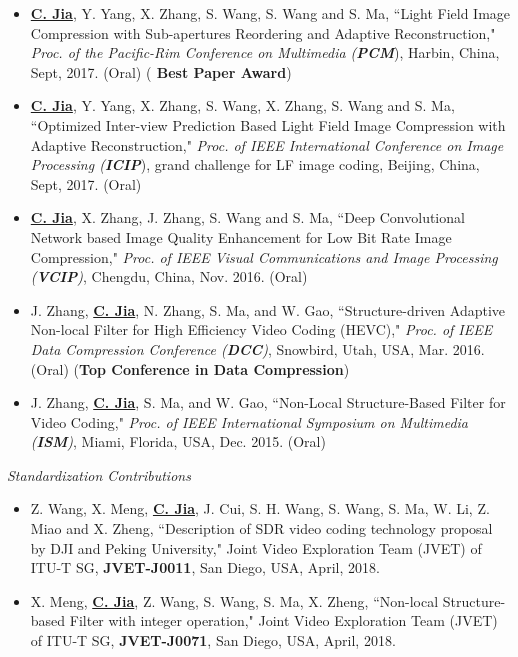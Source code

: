 \documentclass[margin, 10pt]{res} %
\begin{document}
\begin{resume}
\begin{itemize}
\item{\underline{\bf C. Jia}, Y. Yang, X. Zhang, S. Wang, S. Wang and S. Ma, ``Light Field Image Compression with Sub-apertures Reordering and Adaptive Reconstruction," {\em Proc. of the Pacific-Rim Conference on Multimedia ({\bf PCM}}), Harbin, China, Sept, 2017. (Oral)} ({\bf{\color{red} Best Paper Award}})

\item{\underline{\bf C. Jia}, Y. Yang, X. Zhang, S. Wang, X. Zhang, S. Wang and S. Ma, ``Optimized Inter-view Prediction Based Light Field Image Compression with Adaptive Reconstruction," {\em Proc. of IEEE International Conference on Image Processing ({\bf ICIP}}), grand challenge for LF image coding, Beijing, China, Sept, 2017. (Oral)}

\item{\underline{\bf C. Jia}, X. Zhang, J. Zhang, S. Wang and S. Ma, ``Deep Convolutional Network based Image Quality Enhancement for Low Bit Rate Image Compression," {\em Proc. of IEEE Visual Communications and Image Processing ({\bf VCIP})}, Chengdu, China, Nov. 2016. (Oral)}

\item{J. Zhang, \underline{\bf C. Jia},  N. Zhang, S. Ma, and W. Gao, ``Structure-driven Adaptive Non-local Filter for High Efficiency Video Coding (HEVC)," {\em Proc. of IEEE Data Compression Conference ({\bf DCC})}, Snowbird, Utah, USA, Mar. 2016. (Oral) ({\bf Top Conference in Data Compression})}

\item{J. Zhang, \underline{\bf C. Jia}, S. Ma, and W. Gao, ``Non-Local Structure-Based Filter for Video Coding," {\em Proc. of IEEE International Symposium on Multimedia ({\bf ISM})}, Miami, Florida, USA, Dec. 2015. (Oral)}

\end{itemize}

{\sl Standardization Contributions}
\begin{itemize}
\item{Z. Wang, X. Meng, \underline{\bf C. Jia}, J. Cui, S. H. Wang, S. Wang, S. Ma, W. Li, Z. Miao and X. Zheng, ``Description of SDR video coding technology proposal by DJI and Peking University," Joint Video Exploration Team (JVET) of ITU-T SG, {\bf JVET-J0011}, San Diego, USA, April, 2018. }
\item{X. Meng, \underline{\bf C. Jia}, Z. Wang, S. Wang, S. Ma, X. Zheng, ``Non-local Structure-based Filter with integer operation," Joint Video Exploration Team (JVET) of ITU-T SG, {\bf JVET-J0071}, San Diego, USA, April, 2018.}


\end{itemize}
\end{resume}
\end{document}
